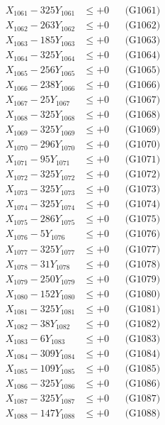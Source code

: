 \documentclass[a4paper,10pt]{article}
\begin{document}
{\begin{align}
\allowbreak
X_{1061} - 325Y_{1061} &\leq +0 && \text{(G1061)} \\
X_{1062} - 263Y_{1062} &\leq +0 && \text{(G1062)} \\
X_{1063} - 185Y_{1063} &\leq +0 && \text{(G1063)} \\
X_{1064} - 325Y_{1064} &\leq +0 && \text{(G1064)} \\
X_{1065} - 256Y_{1065} &\leq +0 && \text{(G1065)} \\
X_{1066} - 238Y_{1066} &\leq +0 && \text{(G1066)} \\
X_{1067} - 25Y_{1067} &\leq +0 && \text{(G1067)} \\
X_{1068} - 325Y_{1068} &\leq +0 && \text{(G1068)} \\
X_{1069} - 325Y_{1069} &\leq +0 && \text{(G1069)} \\
X_{1070} - 296Y_{1070} &\leq +0 && \text{(G1070)} \\
\allowbreak
X_{1071} - 95Y_{1071} &\leq +0 && \text{(G1071)} \\
X_{1072} - 325Y_{1072} &\leq +0 && \text{(G1072)} \\
X_{1073} - 325Y_{1073} &\leq +0 && \text{(G1073)} \\
X_{1074} - 325Y_{1074} &\leq +0 && \text{(G1074)} \\
X_{1075} - 286Y_{1075} &\leq +0 && \text{(G1075)} \\
X_{1076} - 5Y_{1076} &\leq +0 && \text{(G1076)} \\
X_{1077} - 325Y_{1077} &\leq +0 && \text{(G1077)} \\
X_{1078} - 31Y_{1078} &\leq +0 && \text{(G1078)} \\
X_{1079} - 250Y_{1079} &\leq +0 && \text{(G1079)} \\
X_{1080} - 152Y_{1080} &\leq +0 && \text{(G1080)} \\
\allowbreak
X_{1081} - 325Y_{1081} &\leq +0 && \text{(G1081)} \\
X_{1082} - 38Y_{1082} &\leq +0 && \text{(G1082)} \\
X_{1083} - 6Y_{1083} &\leq +0 && \text{(G1083)} \\
X_{1084} - 309Y_{1084} &\leq +0 && \text{(G1084)} \\
X_{1085} - 109Y_{1085} &\leq +0 && \text{(G1085)} \\
X_{1086} - 325Y_{1086} &\leq +0 && \text{(G1086)} \\
X_{1087} - 325Y_{1087} &\leq +0 && \text{(G1087)} \\
X_{1088} - 147Y_{1088} &\leq +0 && \text{(G1088)} \\

\end{align}}
\end{document}
